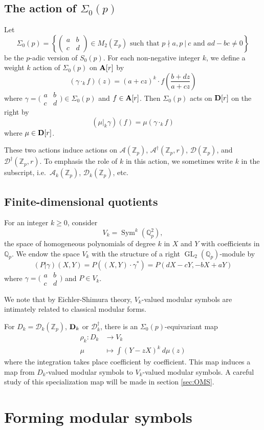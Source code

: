 \documentclass{amsart}
\theoremstyle{plain}
\theoremstyle{definition}
\newcommand{\A}{{\mathcal A}}
\newcommand{\bA}{{\bf A}}
\newcommand{\D}{{\mathcal D}}
\newcommand{\bD}{{\bf D}}
\newcommand{\Z}{{\mathbb Z}}
\newcommand{\Q}{{\mathbb Q}}
\newcommand{\Zp}{\Z_p}
\newcommand{\Qp}{\Q_p}
\newcommand{\maps}{\rightarrow}
\newcommand{\mat}{\begin{pmatrix} a & b \\ c & d \end{pmatrix}}
\newcommand{\smallmat}{\bigl( \begin{smallmatrix} a & b \\ c & d \end{smallmatrix} \bigr)}
\newcommand{\sigop}{\Sigma_0(p)}
\newcommand{\sop}{S_0(p)}
\newcommand{\Arigv}[1]{\bA[#1]}
\newcommand{\Drigv}[1]{\bD[#1]}
\newcommand{\Dvrig}[1]{\bD_{#1}}
\newcommand{\Dkrig}{\Dvrig{k}}
\newcommand{\Aocv}[1]{\A^\dag(\Zp,#1)}
\newcommand{\Dkocv}[1]{\D^\dag(\Zp,#1)}
\newcommand{\Dkoc}{\D_k^\dag}
\newcommand{\Ala}{\A(\Zp)}
\newcommand{\Avla}[1]{\A_{#1}(\Zp)}
\newcommand{\Akla}{\Avla{k}}
\newcommand{\Dvla}[1]{\D_{#1}(\Zp)}
\newcommand{\Dla}{\D(\Zp)}
\newcommand{\Dkla}{\Dvla{k}}
\DeclareMathOperator{\GL}{GL}
\DeclareMathOperator{\Sym}{Sym}
\begin{document}
\subsection{The action of $\sigop$}

Let
$$
\sigop = \left\{  \mat \in M_2(\Zp) \text{~such~that~}
p \nmid a, p~|~c \text{~and~} ad-bc \neq 0 \right\}
$$
be the $p$-adic version of $\sop$.  For each non-negative integer $k$, we define a weight $k$ action of $\sigop$ on $\Arigv{r}$ by
$$
(\gamma \cdot_k f)(z) = (a+cz)^k \cdot f \left( \frac{b+dz}{a+cz} \right)
$$
where $\gamma = \smallmat \in \sigop$ and $f \in \Arigv{r}$.
Then $\sigop$ acts on $\Drigv{r}$ on the right by
$$
(\mu \big|_k \gamma)(f) = \mu(\gamma \cdot_k f)
$$
where $\mu \in \Drigv{r}$.

These two actions induce actions on $\Ala$, $\Aocv{r}$, $\Dla$, and $\Dkocv{r}$.  To emphasis the role of $k$ in this action, we sometimes write $k$ in the subscript, i.e.\ $\Akla$, $\Dkla$, etc.

\subsection{Finite-dimensional quotients}
\label{sec:fdq}

For an integer $k \geq 0$, consider
$$
V_k = \Sym^k(\Qp^2),
$$
the space of homogeneous polynomials of degree $k$ in $X$ and $Y$ with coefficients in $\Qp$. We endow the space $V_k$ with the structure of a right $\GL_2(\Qp)$-module by
$$
(P \big| \gamma)(X,Y) = P\left( (X,Y) \cdot \gamma^*\right) = P(dX-cY,-bX+aY)
$$
where $\gamma = \smallmat$ and $P \in V_{k}$.

We note that by Eichler-Shimura theory, $V_k$-valued modular symbols are intimately related to classical modular forms.

For $D_k = \Dkla$, $\Dkrig$ or $\Dkoc$, there is an $\sigop$-equivariant map
\begin{align*}
\rho_k :D_k &\maps V_k  \\
\mu &\mapsto \int (Y-zX)^k ~d\mu(z)
\end{align*}
where the integration takes place coefficient by coefficient. 
This map induces a map from $D_k$-valued modular symbols to $V_k$-valued modular symbols.  A careful study of this specialization map will be made in section \ref{sec:OMS}.



\section{Forming modular symbols}
\end{document}

